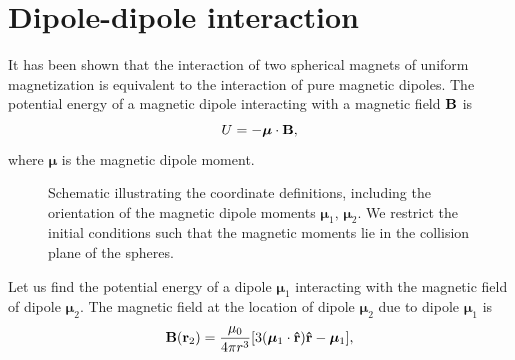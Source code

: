 \documentclass{article}
\begin{document}
\section{Dipole-dipole interaction}
It has been shown \cite{Edwards2017a} that the interaction of two spherical magnets of uniform magnetization is equivalent to the interaction of pure magnetic dipoles. 
The potential energy of a magnetic dipole interacting with a magnetic field $\vb{B}$ is
\begin{equation}
    U=-    \bm{\mu} \cdot \vb{B}, \label{eq:Udef}
\end{equation}
where $   \bm{\mu}$ is the magnetic dipole moment.  
\begin{figure}
    \centering
{}
    \caption{Schematic illustrating the coordinate definitions, including the orientation of the magnetic dipole moments $\bm{\mu}_1, \, \bm{\mu}_2$. We restrict the initial conditions such that the magnetic moments lie in the collision plane of the spheres.}
    \label{fig:coordsDef}
\end{figure}
Let us find the potential energy of a dipole $\bm{\mu}_1$ interacting with the magnetic field of dipole $\bm{\mu}_2$. The magnetic field at the location of dipole $\bm{\mu}_2$ due to dipole $\bm{\mu}_1$ is  \cite{Griffiths_EM}
\begin{equation}
\vb{B}(\vb{r}_{2})=\frac{\mu_0}{4\pi r ^3} [  3(    \bm{\mu}_1 \cdot \vu{r} )\vu{r} -    \bm{\mu}_1  ], \label{eq:Bdef}
\end{equation}
\end{document}
